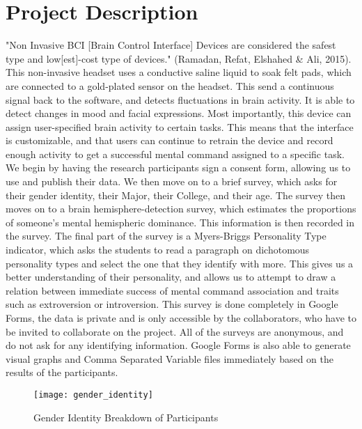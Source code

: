 \documentclass{article}
\begin{document}
\section*{Project Description}
"Non Invasive BCI [Brain Control Interface] Devices are considered the safest type and low[est]-cost type of devices." (Ramadan, Refat, Elshahed & Ali, 2015). This non-invasive headset uses a conductive saline liquid to soak felt pads, which are connected to a gold-plated sensor on the headset. This send a continuous signal back to the software, and detects fluctuations in brain activity. It is able to detect changes in mood and facial expressions. Most importantly, this device can assign user-specified brain activity to certain tasks. This means that the interface is customizable, and that users can continue to retrain the device and record enough activity to get a successful mental command assigned to a specific task. 
\newline \newline
We begin by having the research participants sign a consent form, allowing us to use and publish their data. We then move on to a brief survey, which asks for their gender identity, their Major, their College, and their age. 
\newline \newline
The survey then moves on to a brain hemisphere-detection survey, which estimates the proportions of someone's mental hemispheric dominance. This information is then recorded in the survey.
\newline \newline
The final part of the survey is a Myers-Briggs Personality Type indicator, which asks the students to read a paragraph on dichotomous personality types and select the one that they identify with more. This gives us a better understanding of their personality, and allows us to attempt to draw a relation between immediate success of mental command association and traits such as extroversion or introversion. 
\newline \newline
This survey is done completely in Google Forms, the data is private and is only accessible by the collaborators, who have to be invited to collaborate on the project. All of the surveys are anonymous, and do not ask for any identifying information. Google Forms is also able to generate visual graphs and Comma Separated Variable files immediately based on the results of the participants. 

\begin{figure}[h]
\centering
\texttt{[image: gender\_identity]}
\caption{Gender Identity Breakdown of Participants}
\end{figure}
\end{document}
